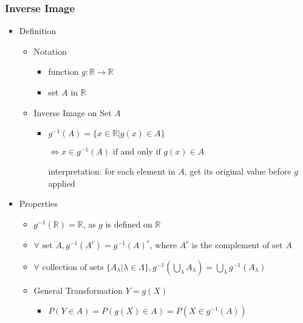 \subsubsection{Inverse Image}
\begin{itemize}
\item Definition
	\begin{itemize}
	\item Notation
		\begin{itemize}
		\item function $g:\mathbb{R} \rightarrow \mathbb{R}$
		\item set $A$ in $\mathbb{R}$
		\end{itemize}
	\item Inverse Image on Set $A$
		\begin{itemize}
		\item $\displaystyle g^{-1}(A) = \{x\in\mathbb{R}|g(x)\in A\}$
		
		$\Leftrightarrow x\in g^{-1}(A) \text{ if and only if } g(x) \in A$
		
		interpretation: for each element in $A$, get its original value before $g$ applied
		\end{itemize}
	\end{itemize}
\item Properties
	\begin{itemize}
	\item $g^{-1}(\mathbb{R}) = \mathbb{R}$, as $g$ is defined on $\mathbb{R}$
	\item $\forall \text{ set } A, g^{-1}(A^c) = g^{-1}(A)^c$, where $A^c$ is the complement of set $A$
	\item $\displaystyle \forall \text{ collection of sets } \{A_\lambda | \lambda \in \Lambda\}, g^{-1}\left( \bigcup_\lambda A_\lambda \right) = \bigcup_\lambda g^{-1}(A_\lambda)$
	\item General Transformation $Y=g(X)$
		\begin{itemize}
		\item $P(Y\in A) = P(g(X)\in A) = P(X \in g^{-1}(A))$
		\end{itemize}
	\end{itemize}
	
\end{itemize}

